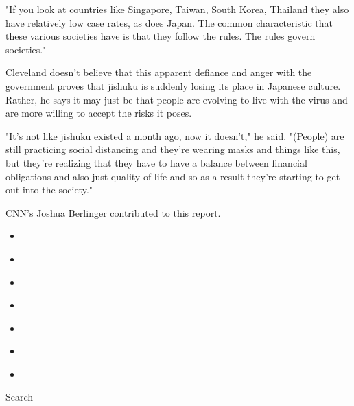 "If you look at countries like Singapore, Taiwan, South Korea, Thailand
they also have relatively low case rates, as does Japan. The common
characteristic that these various societies have is that they follow the
rules. The rules govern societies."

Cleveland doesn't believe that this apparent defiance and anger with the
government proves that jishuku is suddenly losing its place in Japanese
culture. Rather, he says it may just be that people are evolving to live
with the virus and are more willing to accept the risks it poses.

"It's not like jishuku existed a month ago, now it doesn't," he said.
"(People) are still practicing social distancing and they're wearing
masks and things like this, but they're realizing that they have to have
a balance between financial obligations and also just quality of life
and so as a result they're starting to get out into the society."

CNN's Joshua Berlinger contributed to this report.

\begin{itemize}
\item
\end{itemize}

\begin{itemize}
\item
\end{itemize}

\begin{itemize}
\item
\end{itemize}

\begin{itemize}
\item
\end{itemize}

\begin{itemize}
\item
\end{itemize}

\begin{itemize}
\item
\end{itemize}

\begin{itemize}
\item
\end{itemize}

Search

